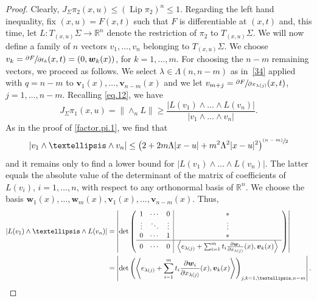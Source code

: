 \documentclass[11pt]{article}
\theoremstyle{definition}
\theoremstyle{jepanonymous}
\theoremstyle{plain}
\newcommand{\psfrac}[2]{\sfrac{(#1)}{#2}}
\newcommand{\R}{\mathbb{R}}
\newcommand{\Rn}{\R^n}
\newcommand{\bv}{{\boldsymbol{v}}}
\newcommand{\bw}{{\boldsymbol{w}}}
\DeclareMathOperator{\rmLip}{\mathrm{Lip}}
\let\la\langle
\let\ra\rangle
\begin{document}
\begin{proof}
Clearly, $J_\Sigma \pi_2(x,u) \leq (\rmLip \pi_2)^n \leq 1$.
Regarding the left hand inequality, fix $(x,u) = F(x,t)$ such that $F$ is differentiable at $(x,t)$ and, this time, let \hbox{$L: T_{(x,u)}\Sigma \to \R^n$} denote the restriction of $\pi_2$ to $T_{(x,u)}\Sigma$.
We will now define a family of $n$ vectors $v_1,\ldots,v_n$ belonging to $T_{(x,u)}\Sigma$.
We choose $v_k = \sfrac{\partial F}{\partial t_k}(x,t) = (0,\bw_k(x))$, for $k=1,\ldots,m$.
For choosing the $n-m$ remaining vectors, we proceed as follows.
We select $\lambda \in \Lambda(n,n-m)$ as in~\ref{34} applied with $q=n-m$ to $\bv_1(x),\ldots,\bv_{n-m}(x)$ and we let $v_{m+j} = \sfrac{\partial F}{\partial x_{\lambda(j)}}(x,t)$, $j=1,\ldots,n-m$.
Recalling \eqref{eq.12}, we have
\begin{equation*}
J_\Sigma \pi_1(x,u) = \|{\wedge}_n L \| \geq \frac{|L(v_1) \wedge \ldots \wedge L(v_n)|}{|v_1 \wedge \ldots \wedge v_n|}.
\end{equation*}
As in the proof of \ref{factor.pi.1}, we find that
\begin{equation*}
|v_1 \wedge \ldots \wedge v_n| \leq \left(2 + 2 m \Lambda |x-u| + m^2\Lambda^2|x-u|^2 \right)^{\psfrac{n-m}{2}}
\end{equation*}
and it remains only to find a lower bound for $|L(v_1) \wedge \ldots \wedge L(v_n)|$.
The latter equals the absolute value of the determinant of the matrix of coefficients of $L(v_i)$, $i=1,\ldots,n$, with respect to any orthonormal basis of $\Rn$.
We choose the basis $\bw_1(x),\ldots,\bw_m(x),\bv_1(x),\ldots,\bv_{n-m}(x)$.
Thus,
\begin{equation}
\label{eq.13}
\begin{split}
|L(v_1) \wedge \ldots \wedge L(v_n)| & = \left| \det \left(
\begin{array}{c c c | c}
1 & \cdots & 0 & * \\
\vdots & \ddots & \vdots & \vdots \\
0 & \cdots & 1 & * \\
\hline
0 & \cdots & 0 & \left\la e_{\lambda(j)} + \sum_{i=1}^m t_i \frac{\partial \bw_i}{\partial x_{\lambda(j)}}(x), \bv_k(x) \right\ra \\
\end{array}
\right)\right| \\
& = \left| \det \left(\left\la e_{\lambda(j)} + \sum_{i=1}^m t_i \frac{\partial \bw_i}{\partial x_{\lambda(j)}}(x), \bv_k(x) \right\ra\right)_{j,k=1,\ldots,n-m}\right|.
\end{split}

\end{equation}
\end{proof}
\end{document}
